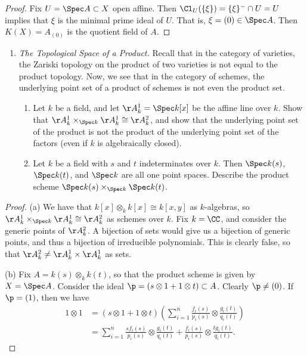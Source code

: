 \documentclass[12pt]{amsart}
\begin{document}
 \begin{proof}
   Fix $U=\Spec A\subset X$ open affine.
   Then $\Cl_U(\{\xi\})=\{\xi\}^-\cap U=U$ implies that $\xi$ is the minimal prime ideal of $U$.
   That is, $\xi=(0)\in \Spec A$.
   Then $K(X)= A_{(0)}$ is the quotient field of $A$.
 \end{proof}
\begin{enumerate}
	\item[3.9.] {
      \emph{The Topological Space of a Product.}
      Recall that in the category of varieties, the Zariski topology on the product of two varieties is not equal to the product topology.
      Now, we see that in the category of schemes, the underlying point set of a product of schemes is not even the product set.
      \begin{enumerate}
        \item Let $k$ be a field, and let $\AA^1_k=\Spec k[x]$ be the affine line over $k$.
          Show that $\AA_k^1\times_{\Spec k}\AA_k^1\cong \AA_k^2$, and show that the underlying point set of the product is not the product of the underlying point set of the factors (even if $k$ is algebraically closed).
        \item Let $k$ be a field with $s$ and $t$ indeterminates over $k$.
          Then $\Spec k(s)$, $\Spec k(t)$, and $\Spec k$ are all one point spaces.
          Describe the product scheme $\Spec k(s)\times_{\Spec k}\Spec k(t)$.
      \end{enumerate}
    }
\end{enumerate}

\begin{proof}
  (a) We have that $k[x]\otimes_k k[x]\cong k[x,y]$ as $k$-algebras, so $\AA_k^1\times_{\Spec k}\AA_k^1\cong \AA_k^2$ as schemes over $k$.
  Fix $k=\CC$, and consider the generic points of $\AA_k^2$.
  A bijection of sets would give us a bijection of generic points, and thus a bijection of irreducible polynomials.
  This is clearly false, so that $\AA_k^2\neq \AA_k^1\times \AA_k^1$ as sets.

  (b) Fix $A=k(s)\otimes_k k(t)$, so that the product scheme is given by $X=\Spec A$.
  Consider the ideal $\p=(s\otimes 1 +1\otimes t)\subset A$.
  Clearly $\p\neq (0)$.
  If $\p=(1)$, then we have
  \begin{align*}
    1\otimes 1 &= (s\otimes 1 + 1\otimes t)\left(\sum_{i=1}^n \frac{f_i(s)}{p_i(s)}\otimes \frac{g_i(t)}{q_i(t)}\right) \\
      &= \sum_{i=1}^n\frac{sf_i(s)}{p_i(s)}\otimes \frac{g_i(t)}{q_i(t)} +
      \frac{f_i(s)}{p_i(s)}\otimes \frac{tg_i(t)}{q_i(t)}.
  \end{align*}
\end{proof}
\end{document}
